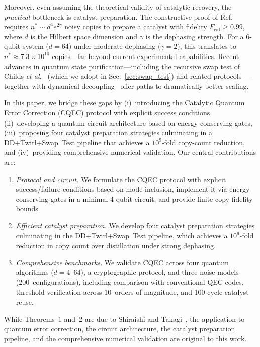 \documentclass[prx,twocolumn,superscriptaddress,longbibliography,floatfix]{revtex4-2}
\begin{document}
Moreover, even assuming the theoretical validity of catalytic recovery, the \emph{practical} bottleneck is catalyst preparation.
The constructive proof of Ref.~\cite{Shiraishi2024} requires $n^* \sim d^4 e^{2\gamma}$ noisy copies to prepare a catalyst with fidelity $F_\mathrm{cat} \geq 0.99$, where $d$ is the Hilbert space dimension and $\gamma$ is the dephasing strength.
For a 6-qubit system ($d = 64$) under moderate dephasing ($\gamma = 2$), this translates to $n^* \approx 7.3 \times 10^{10}$ copies---far beyond current experimental capabilities.
Recent advances in quantum state purification---including the recursive swap test of Childs \emph{et al.}~\cite{Childs2025} (which we adopt in Sec.~\ref{sec:swap_test}) and related protocols~\cite{Yao2025,Zhao2026}---together with dynamical decoupling~\cite{Viola1999,MeiboomGill1958} offer paths to dramatically better scaling.

In this paper, we bridge these gaps by (i)~introducing the Catalytic Quantum Error Correction (CQEC) protocol with explicit success conditions, (ii)~developing a quantum circuit architecture based on energy-conserving gates, (iii)~proposing four catalyst preparation strategies culminating in a DD+Twirl+Swap~Test pipeline that achieves a $10^9$-fold copy-count reduction, and (iv)~providing comprehensive numerical validation.
Our central contributions are:
\begin{enumerate}
\item \emph{Protocol and circuit.} We formulate the CQEC protocol with explicit success/failure conditions based on mode inclusion, implement it via energy-conserving gates in a minimal 4-qubit circuit, and provide finite-copy fidelity bounds.
\item \emph{Efficient catalyst preparation.} We develop four catalyst preparation strategies culminating in the DD+Twirl+Swap~Test pipeline, which achieves a $10^9$-fold reduction in copy count over distillation under strong dephasing.
\item \emph{Comprehensive benchmarks.} We validate CQEC across four quantum algorithms ($d = 4$--$64$), a cryptographic protocol, and three noise models (200~configurations), including comparison with conventional QEC codes, threshold verification across 10~orders of magnitude, and 100-cycle catalyst reuse.
\end{enumerate}
While Theorems~1 and~2 are due to Shiraishi and Takagi~\cite{Shiraishi2024}, the application to quantum error correction, the circuit architecture, the catalyst preparation pipeline, and the comprehensive numerical validation are original to this work.
\end{document}
